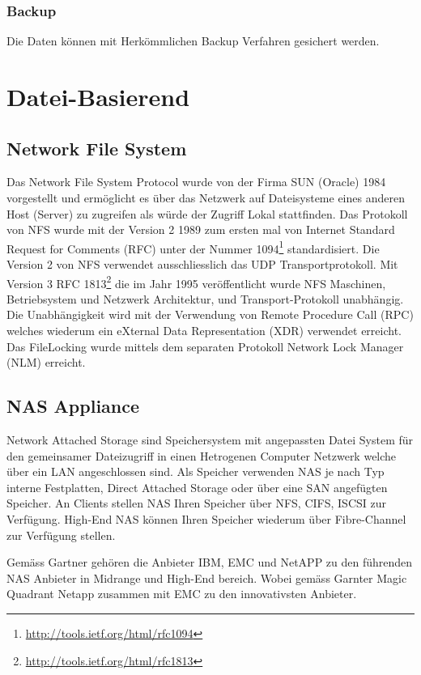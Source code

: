 \subsubsection{Backup}
Die Daten können mit Herkömmlichen Backup Verfahren gesichert werden.


\section{Datei-Basierend}


\subsection{Network File System}
Das Network File System Protocol wurde von der Firma SUN (\gls{Oracle}) 1984 vorgestellt und ermöglicht es über das Netzwerk auf Dateisysteme eines anderen Host  (Server) zu zugreifen als würde der Zugriff Lokal stattfinden. Das Protokoll von \gls{NFS} wurde mit der Version 2 1989 zum ersten mal von Internet Standard Request for Comments (\gls{RFC}) unter der Nummer 1094\footnote{\url{http://tools.ietf.org/html/rfc1094}} standardisiert. Die Version 2 von NFS verwendet ausschliesslich das \gls{UDP} Transportprotokoll. Mit Version 3 RFC 1813\footnote{\url{http://tools.ietf.org/html/rfc1813}} die im Jahr 1995 veröffentlicht wurde NFS Maschinen, Betriebsystem und Netzwerk Architektur, und Transport-Protokoll unabhängig. Die Unabhängigkeit wird mit der Verwendung von Remote Procedure Call (\gls{RPC}) welches wiederum ein eXternal Data Representation (\gls{XDR}) verwendet erreicht. Das \gls{FileLocking} wurde mittels dem separaten Protokoll Network Lock Manager (NLM) erreicht. 


\subsection{NAS Appliance}

Network Attached Storage sind Speichersystem mit angepassten Datei System für den gemeinsamer Dateizugriff in einen Hetrogenen Computer Netzwerk welche über ein LAN angeschlossen sind. Als Speicher verwenden NAS je nach Typ interne Festplatten, Direct Attached Storage oder über eine SAN angefügten Speicher.
An Clients stellen NAS Ihren Speicher über NFS, CIFS, ISCSI zur Verfügung. High-End NAS können Ihren Speicher wiederum über Fibre-Channel zur Verfügung stellen.

Gemäss Gartner gehören die Anbieter IBM, EMC und NetAPP zu den führenden NAS Anbieter in Midrange und High-End bereich. Wobei gemäss Garnter Magic Quadrant Netapp zusammen mit EMC zu den innovativsten Anbieter.


